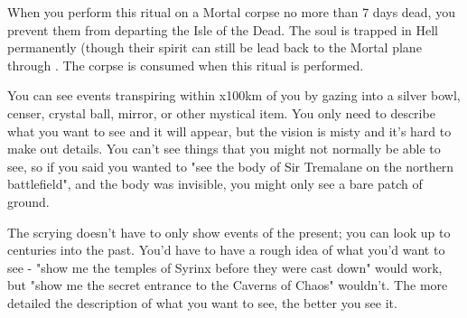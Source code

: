 {

\OCCULT[
  Name=Damning,
  Link=occultism-damning,
  Success=5,
  Cost=6666,
  Widdershins=0
]

When you perform this ritual on a Mortal corpse no more than 7 days dead, you prevent them from departing the Isle of the Dead.  The soul is trapped in Hell permanently (though their spirit can still be lead back to the Mortal plane through .  The corpse is consumed when this ritual is performed.


\OCCULT[
  Name=Descry,
  Link=occultism-descry,
  Success=2,
  Cost=500+,
  Widdershins=0
]

You can see events transpiring within \LVL x100km of you by gazing into a silver bowl, censer, crystal ball, mirror, or other mystical item.  You only need to describe what you want to see and it will appear, but the vision is misty and it's hard to make out details.  You can't see things that you might not normally be able to see, so if you said you wanted to "see the body of Sir Tremalane on the northern battlefield", and the body was invisible, you might only see a bare patch of ground.  

The scrying doesn't have to only show events of the present; you can look up to \LVL centuries into the past.  You'd have to have a rough idea of what you'd want to see - "show me the temples of Syrinx before they were cast down" would work, but "show me the secret entrance to the Caverns of Chaos" wouldn't.  The more detailed the description of what you want to see, the better you see it.

}
